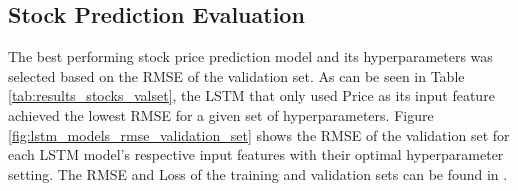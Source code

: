\documentclass[11pt, a4paper]{article}
\begin{document}
\begin{table}[!ht]
    \caption{Test Set Macro Average Evaluation Metrics Models}
    \label{tab:results}
    \centering
    \small
\end{table}
\newpage
\subsection{Stock Prediction Evaluation}
The best performing stock price prediction model and its hyperparameters was selected based on the RMSE of the validation set. As can be seen
in Table \ref{tab:results_stocks_valset}, the LSTM that only used Price as its input feature achieved the lowest RMSE for a given set of hyperparameters.
Figure \ref{fig:lstm_models_rmse_validation_set} shows the RMSE of the validation set for each LSTM model's respective input features with their optimal hyperparameter setting.
The RMSE and Loss of the training and validation sets can be found in .
\end{document}
